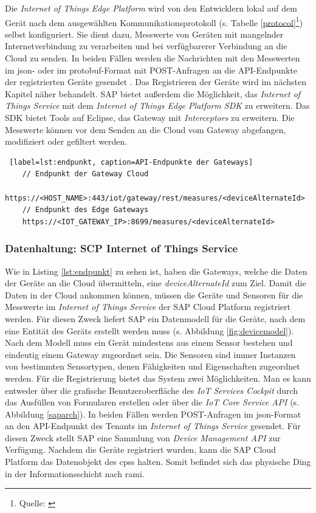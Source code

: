   \noindent Die \textit{Internet of Things Edge Platform} wird von den Entwicklern lokal auf dem Gerät nach dem ausgewählten Kommunikationsprotokoll (s. Tabelle \ref{protocol}\footnote{Quelle: \citet{SAP2020}}) selbst konfiguriert. Sie dient dazu, Messwerte von Geräten mit mangelnder Internetverbindung zu verarbeiten und bei verfügbarerer Verbindung an die Cloud zu senden. In beiden Fällen werden die Nachrichten mit den Messwerten im \ac{json}- oder im \ac{protobuf}-Format mit POST-Anfragen an die API-Endpunkte der registrierten Geräte gesendet \citep{SAP2020}. Das Registrieren der Geräte wird im nächsten Kapitel näher behandelt. SAP bietet außerdem die Möglichkeit, das \textit{Internet of Things Service} mit dem \textit{Internet of Things Edge Platform SDK} zu erweitern. Das SDK bietet Tools auf Eclipse, das Gateway mit \textit{Interceptors} zu erweitern. Die Messwerte können vor dem Senden an die Cloud vom Gateway abgefangen, modifiziert oder gefiltert werden.
\newline
  \begin{lstlisting} [label=lst:endpunkt, caption=API-Endpunkte der Gateways]
    // Endpunkt der Gateway Cloud
    https://<HOST_NAME>:443/iot/gateway/rest/measures/<deviceAlternateId>
    // Endpunkt des Edge Gateways
    https://<IOT_GATEWAY_IP>:8699/measures/<deviceAlternateId>
  \end{lstlisting}



\subsubsection{Datenhaltung: SCP Internet of Things Service} \label{iotcp}

Wie in Listing \ref{lst:endpunkt} zu sehen ist, haben die Gateways, welche die Daten der Geräte an die Cloud übermitteln, eine \textit{deviceAlternateId} zum Ziel. Damit die Daten in der Cloud ankommen können, müssen die Geräte und Sensoren für die Messwerte im \textit{Internet of Things Service} der SAP Cloud Platform registriert werden. Für diesen Zweck liefert SAP ein Datenmodell für die Geräte, nach dem eine Entität des Geräts erstellt werden muss (s. Abbildung \ref{fig:devicemodel}). Nach dem Modell muss ein Gerät mindestens aus einem Sensor bestehen und eindeutig einem Gateway zugeordnet sein. Die Sensoren sind immer Instanzen von bestimmten Sensortypen, denen Fähigkeiten und Eigenschaften zugeordnet werden.
Für die Registrierung bietet das System zwei Möglichkeiten. Man es kann entweder über die grafische Benutzeroberfläche des \textit{IoT Services Cockpit} durch das Ausfüllen von Formularen erstellen oder über die \textit{IoT Core Service API} (s. Abbildung \ref{saparch}). In beiden Fällen werden POST-Anfragen im \ac{json}-Format an den API-Endpunkt des Tenants im \textit{Internet of Things Service} gesendet. Für diesen Zweck stellt SAP eine Sammlung von \textit{Device Management API} zur Verfügung. Nachdem die Geräte registriert wurden, kann die SAP Cloud Platform das Datenobjekt des \ac{cpss} halten. Somit befindet sich das physische Ding in der Informationsschicht nach \ac{rami}.

